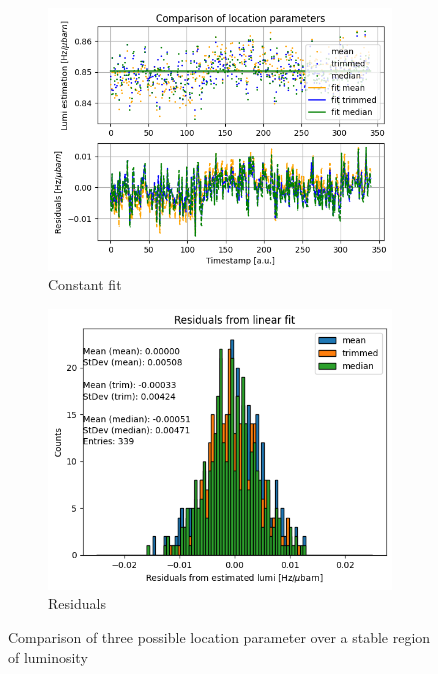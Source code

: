 \begin{figure}
    \centering
    \begin{subfigure}{0.48\textwidth}
    \includegraphics[width=\linewidth]{figures/fit_wo_outliers.png}
    \caption{Constant fit}\label{fig:costant_fit_location}
    \end{subfigure}
    \begin{subfigure}{0.48\textwidth}
    \includegraphics[width=\linewidth]{figures/resiudals_without_outliers.png}
    \caption{Residuals}\label{fig:res_location}
    \end{subfigure}
    \caption{Comparison of three possible location parameter over a stable region of luminosity}
    \label{fig:lumi_fit_location_param}
\end{figure}

